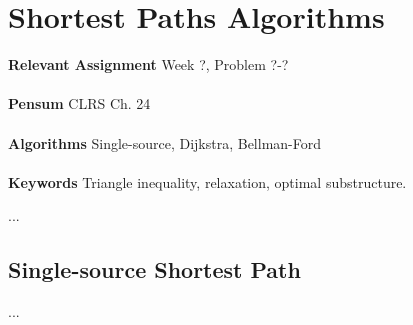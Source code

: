 
\chapter{Shortest Paths Algorithms}
\label{ch:shortestpathsalgorithms}

\textbf{Relevant Assignment} Week ?, Problem ?-?\\\\
\textbf{Pensum} CLRS Ch. 24\\\\
\textbf{Algorithms} Single-source, Dijkstra, Bellman-Ford\\\\
\textbf{Keywords} Triangle inequality, relaxation, optimal substructure.
\vspace{1in}

\noindent ...

\section{Single-source Shortest Path}
...
